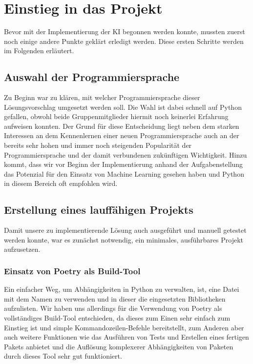 \chapter{Einstieg in das Projekt}
\label{ch:planung}

Bevor mit der Implementierung der \ac{KI} begonnen werden konnte, mussten zuerst noch einige andere Punkte geklärt
\bzw erledigt werden.
Diese ersten Schritte werden im Folgenden erläutert.

\section{Auswahl der Programmiersprache}
\label{sec:auswahl-programmiersprache}

Zu Beginn war zu klären, mit welcher Programmiersprache dieser Lösungsvorschlag umgesetzt werden soll.
Die Wahl ist dabei schnell auf Python gefallen, obwohl beide Gruppenmitglieder hiermit noch keinerlei Erfahrung
aufweisen konnten.
Der Grund für diese Entscheidung liegt neben dem starken Interessen an dem Kennenlernen einer neuen Programmiersprache
auch an der bereits sehr hohen und immer noch steigenden Popularität der Programmiersprache und der damit verbundenen
zukünftigen Wichtigkeit.  
Hinzu kommt, dass wir vor Beginn der Implementierung anhand der Aufgabenstellung das Potenzial für den Einsatz von
Machine Learning gesehen haben und Python in diesem Bereich oft empfohlen wird.  

\section{Erstellung eines lauffähigen Projekts}
\label{sec:erstellung-projekt}

Damit unsere zu implementierende Lösung auch ausgeführt und manuell getestet werden konnte, war es zunächst notwendig,
ein minimales, ausführbares Projekt aufzusetzen.

\subsection{Einsatz von Poetry als Build-Tool}
\label{subsec:poetry}

Ein einfacher Weg, um Abhängigkeiten in Python zu verwalten, ist, eine Datei mit dem Namen  zu
verwenden und in dieser die eingesetzten Bibliotheken aufzulisten. 
Wir haben uns allerdings für die Verwendung von Poetry als vollständiges Build-Tool entschieden, da dieses zum Einen
sehr einfach zum Einstieg ist und simple Kommandozeilen-Befehle bereitstellt, zum Anderen aber auch weitere Funktionen
wie das Ausführen von Tests und Erstellen eines fertigen Pakets anbietet und die Auflösung komplexerer Abhängigkeiten
von Paketen durch dieses Tool sehr gut funktioniert. 

